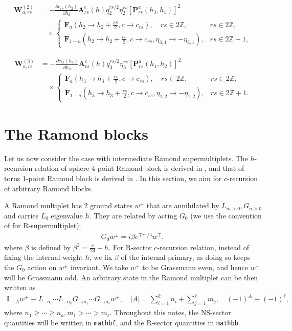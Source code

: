 \documentclass[12pt]{article}
\newcommand{\ie}{\begin{equation}\begin{aligned}}
\newcommand{\fe}{\end{aligned}\end{equation}}
\numberwithin{equation}{section}
\begin{document}
\ie
\mathbf{W}^{(2)}_{a,rs} &= -\frac{\partial c_{rs}(h_2)}{\partial h_2} \mathbf{A}_{rs}^c(h) q_2^{rs/2}\eta_2^{rs} [\mathbf{P}_{rs}^a(h_3, h_1)]^2\\
&\quad \times \begin{cases}
\mathbf{F}_{a}(h_2 \rightarrow h_2+\tfrac{rs}{2}, c\rightarrow c_{rs}),\quad rs\in 2\mathbb{Z}, & rs\in 2\mathbb{Z},\\
\mathbf{F}_{1-a}(h_2 \rightarrow h_2+\tfrac{rs}{2}, c\rightarrow c_{rs},\eta_{3,1}\rightarrow -\eta_{3,1}),& rs\in 2\mathbb{Z}+1,
\end{cases}
\fe

\ie
\mathbf{W}^{(3)}_{a,rs} &= -\frac{\partial c_{rs}(h_3)}{\partial h_3} \mathbf{A}_{rs}^c(h) q_3^{rs/2}\eta_3^{rs} [\mathbf{P}_{rs}^a(h_1, h_2)]^2\\
&\quad \times \begin{cases}
\mathbf{F}_{a}(h_3 \rightarrow h_3+\tfrac{rs}{2}, c\rightarrow c_{rs}),\quad rs\in 2\mathbb{Z}, & rs\in 2\mathbb{Z},\\
\mathbf{F}_{1-a}(h_3 \rightarrow h_3+\tfrac{rs}{2}, c\rightarrow c_{rs},\eta_{1,2}\rightarrow -\eta_{1,2}),& rs\in 2\mathbb{Z}+1.
\end{cases}
\fe




\section{The Ramond blocks}

Let us now consider the case with intermediate Ramond supermultiplets. The $h$-recursion relation of sphere 4-point Ramond block is derived in \cite{0810.1203, 1012.2974}, and that of torus 1-point Ramond block is derived in \cite{1207.5740}. In this section, we aim for $c$-recursion of arbitrary Ramond blocks.

A Ramond multiplet has 2 ground states $w^\pm$ that are annihilated by $L_{m>0}, G_{n>0}$ and carries $L_0$ eigenvalue $h$. They are related by acting $G_0$ (we use the convention of \cite{0810.1203} for R-supermultiplet):
\ie
G_0 w^\pm = i \beta e^{\mp i\pi/4} w^\mp,
\fe
where $\beta$ is defined by $\beta^2 = \frac{c}{24}-h$. For R-sector $c$-recursion relation, instead of fixing the internal weight $h$, we fix $\beta$ of the internal primary, as doing so keeps the $G_0$ action on $w^\pm$ invariant. We take $w^+$ to be Grassmann even, and hence $w^-$ will be Grassmann odd. An arbitrary state in the Ramond multiplet can be then written as
\ie
\mathbb{L}_{-A} w^\pm \equiv L_{-n_1}\cdots L_{-n_k} G_{-m_1}\cdots G_{-m_\ell} w^\pm,\quad |A|= \sum_{i=1}^k n_i + \sum_{j=1}^\ell m_j,\quad (-1)^A \equiv (-1)^\ell,
\fe
where $n_1\geq \cdots \geq n_k, m_1>\cdots > m_\ell$. Throughout this notes, the NS-sector quantities will be written in \texttt{mathbf}, and the R-sector quantities in \texttt{mathbb}.
\end{document}
